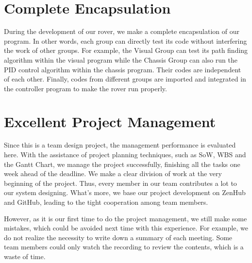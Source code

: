 \section{Complete Encapsulation}
During the development of our rover, we make a complete encapsulation of our program. In other words, each group can directly test its code without interfering the work of other groups. For example, the Visual Group can test its path finding algorithm within the visual program while the Chassis Group can also run the PID control algorithm within the chassis program. Their codes are independent of each other. Finally, codes from different groups are imported and integrated in the controller program to make the rover run properly.

\section{Excellent Project Management}
Since this is a team design project, the management performance is evaluated here. With the assistance of project planning techniques, such as SoW, WBS and the Gantt Chart, we manage the project successfully, finishing all the tasks one week ahead of the deadline. We make a clear division of work at the very beginning of the project. Thus, every member in our team contributes a lot to our system designing. What's more, we base our project development on ZenHub and GitHub, leading to the tight cooperation among team members.

However, as it is our first time to do the project management, we still make some mistakes, which could be avoided next time with this experience. For example, we do not realize the necessity to write down a summary of each meeting. Some team members could only watch the recording to review the contents, which is a waste of time.




